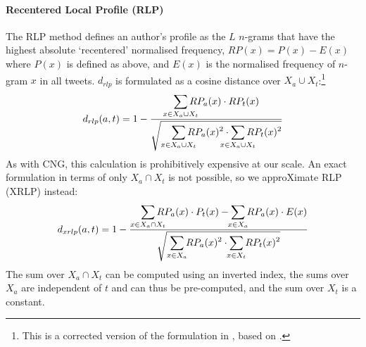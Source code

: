 \documentclass[twocolumn,10pt]{article}
\begin{document}
\paragraph{Recentered Local Profile (RLP)} The RLP method\supercite{layton2012recentred}
defines an author's profile as the $L$ $n$-grams that have
the highest absolute `recentered' normalised frequency,
$RP(x) = P(x) - E(x)$ where $P(x)$ is defined as above, and
$E(x)$ is the normalised frequency of $n$-gram $x$ in all tweets.
$d_{rlp}$ is formulated as a cosine distance over
$X_a \cup X_t$:\footnote{
This is a corrected version of the formulation in \cite{layton2012recentred},
based on \cite{layton2014tutorial}.}
$$
d_{rlp}(a, t) = 1 -
\frac{\displaystyle
    \smashoperator{\sum_{x \in X_a \cup X_t}}
        RP_a(x) \cdot RP_t(x)
}{\displaystyle
    \sqrt{\smashoperator[r]{\sum_{x \in X_a \cup X_t}} RP_a(x)^2
    \cdot \smashoperator{\sum_{x \in X_a \cup X_t}} RP_t(x)^2}
}
$$
As with CNG, this calculation is prohibitively expensive at our scale.
An exact formulation in terms of only $X_a \cap X_t$ is not possible,
so we approXimate RLP (XRLP) instead:
$$
d_{xrlp}(a, t) = 1 -
\frac{\displaystyle
    \smashoperator[r]{\sum_{x \in X_a \cap X_t}}
        RP_a(x) \cdot P_t(x)
    - \smashoperator{\sum_{x \in X_a}}
        RP_a(x) \cdot E(x)
}{\displaystyle
    \sqrt{\smashoperator[r]{\sum_{x \in X_a}} RP_a(x)^2
    \cdot \smashoperator{\sum_{x \in X_t}} RP_t(x)^2}
}
$$
The sum over $X_a \cap X_t$ can be computed using an inverted index,
the sums over $X_a$ are independent of $t$ and can thus be pre-computed,
and the sum over $X_t$ is a constant.

\end{document}
